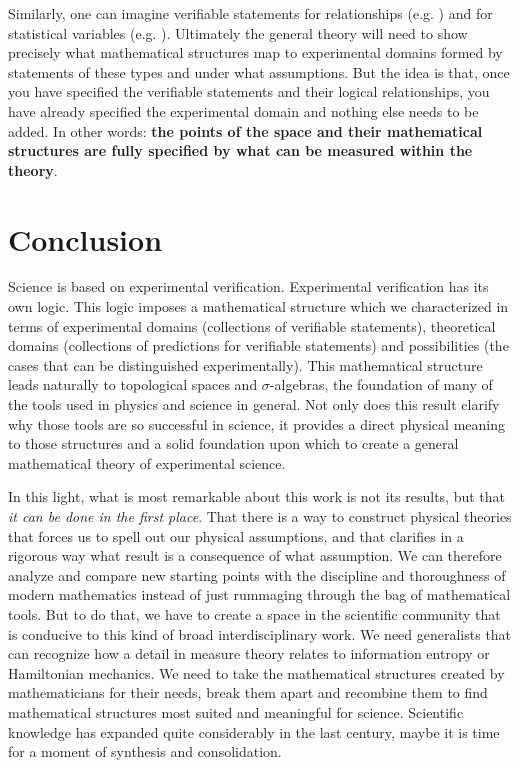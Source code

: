 \documentclass[letterpaper]{article}
\begin{document}
Similarly, one can imagine verifiable statements for relationships (e.g. ) and for statistical variables (e.g. ). Ultimately the general theory will need to show precisely what mathematical structures map to experimental domains formed by statements of these types and under what assumptions. But the idea is that, once you have specified the verifiable statements and their logical relationships, you have already specified the experimental domain and nothing else needs to be added. In other words: \textbf{the points of the space and their mathematical structures are fully specified by what can be measured within the theory}.

\section{Conclusion}

Science is based on experimental verification. Experimental verification has its own logic. This logic imposes a mathematical structure which we characterized in terms of experimental domains (collections of verifiable statements), theoretical domains (collections of predictions for verifiable statements) and possibilities (the cases that can be distinguished experimentally). This mathematical structure leads naturally to topological spaces and $\sigma$-algebras, the foundation of many of the tools used in physics and science in general. Not only does this result clarify why those tools are so successful in science, it provides a direct physical meaning to those structures and a solid foundation upon which to create a general mathematical theory of experimental science.

In this light, what is most remarkable about this work is not its results, but that \emph{it can be done in the first place}. That there is a way to construct physical theories that forces us to spell out our physical assumptions, and that clarifies in a rigorous way what result is a consequence of what assumption. We can therefore analyze and compare new starting points with the discipline and thoroughness of modern mathematics instead of just rummaging through the bag of mathematical tools. But to do that, we have to create a space in the scientific community that is conducive to this kind of broad interdisciplinary work. We need generalists that can recognize how a detail in measure theory relates to information entropy or Hamiltonian mechanics. We need to take the mathematical structures created by mathematicians for their needs, break them apart and recombine them to find mathematical structures most suited and meaningful for science. Scientific knowledge has expanded quite considerably in the last century, maybe it is time for a moment of synthesis and consolidation.
\end{document}
